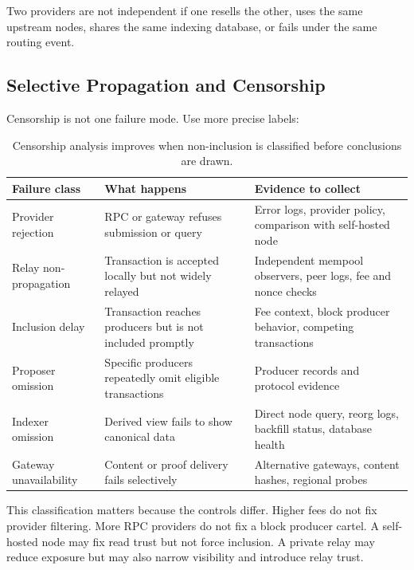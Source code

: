 Two providers are not independent if one resells the other, uses the same upstream nodes, shares the same indexing database, or fails under the same routing event.

\subsection{Selective Propagation and Censorship}

Censorship is not one failure mode. Use more precise labels:

\begin{table}[htbp]
\centering
\small
\renewcommand{\arraystretch}{1.16}
\begin{tabularx}{\textwidth}{@{}>{\RaggedRight\arraybackslash}p{}>{\RaggedRight\arraybackslash}p{}X@{}}
\toprule
Failure class & What happens & Evidence to collect \\
\midrule
Provider rejection & RPC or gateway refuses submission or query & Error logs, provider policy, comparison with self-hosted node \\
Relay non-propagation & Transaction is accepted locally but not widely relayed & Independent mempool observers, peer logs, fee and nonce checks \\
Inclusion delay & Transaction reaches producers but is not included promptly & Fee context, block producer behavior, competing transactions \\
Proposer omission & Specific producers repeatedly omit eligible transactions & Producer records and protocol evidence \\
Indexer omission & Derived view fails to show canonical data & Direct node query, reorg logs, backfill status, database health \\
Gateway unavailability & Content or proof delivery fails selectively & Alternative gateways, content hashes, regional probes \\
\bottomrule
\end{tabularx}
\caption{Censorship analysis improves when non-inclusion is classified before conclusions are drawn.}
\end{table}

This classification matters because the controls differ. Higher fees do not fix provider filtering. More RPC providers do not fix a block producer cartel. A self-hosted node may fix read trust but not force inclusion. A private relay may reduce exposure but may also narrow visibility and introduce relay trust.

